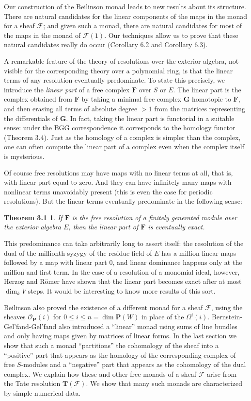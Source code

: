 \documentclass{tran-l}
\newcommand{\F}{\mathcal{F}}
\newcommand{\FF}{\mathbf{F}}
\newcommand{\GG}{\mathbf{G}}
\newcommand{\myP}{\mathbf{P}}
\newcommand{\PP}{\mathbf{P}}
\newcommand{\TT}{\mathbf{T}}
\theoremstyle{plain}
\newtheorem*{theorem2}{Theorem 3.1}
\theoremstyle{remark}
\theoremstyle{definition}
\begin{document}
Our construction of the Beilinson monad leads to new results about its
structure.  There are natural candidates for the linear components of
the maps in the monad for a sheaf $\F $; and given such a monad, there
are natural candidates for most of the maps in the monad of
$\F (1)$. Our techniques allow us to prove that these natural
candidates really do occur (Corollary 6.2 and Corollary 6.3).

A remarkable feature of the theory of resolutions
over the exterior algebra, not visible for
the corresponding theory over a polynomial ring, is that the linear
terms of any  resolution eventually predominate.
To state this precisely, we introduce the
{\em linear part\/} of a free complex $\FF $ over $S$ or $E$. The linear
part
is the complex obtained from $\FF $ by taking a minimal free
complex $\GG $ homotopic to $\FF $, and then erasing all terms of
absolute degree $>1$ from the matrices representing
the differentials of $\GG $. In fact, taking the linear
part is functorial in a suitable sense:
under the BGG correspondence it corresponds to the  homology
functor (Theorem 3.4).
Just as the homology of a complex is simpler than the complex,
one can often compute the linear part of a complex even when the
complex itself is mysterious.

Of course free resolutions may have maps with no linear
terms at all, that is, with linear part equal
to zero. And they can have infinitely many maps with nonlinear
terms unavoidably present (this is even the case for periodic
resolutions). But the linear
terms eventually predominate in the following
sense:

\begin{theorem2} If\/ $\FF $ is the free
resolution of  a finitely generated  module
over the exterior algebra $E$,
then the linear part of\/ $\FF $ is eventually exact.
\end{theorem2}


This predominance can take arbitrarily long to assert itself: the
resolution of the dual of the millionth syzygy of the residue field of
$E$ has a million linear maps followed by a map with
linear part 0, and linear dominance happens only at the
million and first term. In the case of a resolution
of a monomial ideal, however, Herzog and R\"{o}mer \cite{HR} have
shown that the linear part becomes exact after at most
$\dim _{k} V$ steps. It would be interesting to know more results of
this sort.

Beilinson \cite{Bei} also proved the existence of a different monad for a
sheaf $\F $, using the sheaves $\mathcal{O}_{\myP }(i)$ 
for $0\leq i\leq n = \dim \PP (W)$ in place of the $\Omega ^{i}(i)$. Bernstein-Gel'fand-Gel'fand
also introduced a ``linear'' monad using sums of line bundles and only
having maps given by matrices of linear forms.  In the last section we
show that such a monad ``partitions'' the cohomology of the sheaf into
a ``positive'' part that appears as the homology of the corresponding
complex of free $S$-modules and a ``negative'' part that appears as
the cohomology of the dual complex.  We explain how these and other
free monads of a sheaf $\F $ arise from the Tate resolution
$\TT (\F )$. We show that many such monads are characterized by simple
numerical data.
\end{document}
